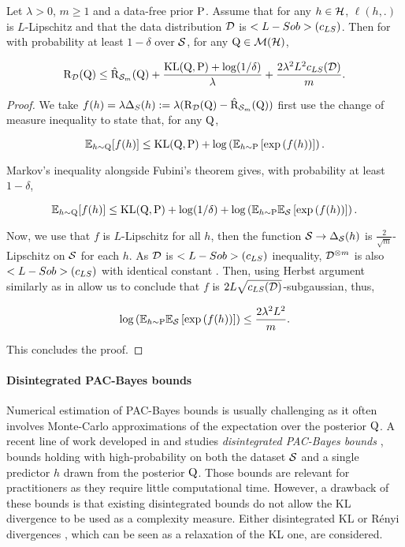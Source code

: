 \begin{noaddcontents}
    \begin{corollary}
      \label{cor: catoni_lpz}
      Let $\lambda >0$, $m\geq 1$ and a data-free prior $\P$. Assume that for any $h\in\Hcal$, $\ell(h,.)$ is $L$-Lipschitz and that the data distribution $\D$ is $\Lsob(c_{LS})$. Then for with probability at least $1-\delta$ over $\S$, for any $\Q\in \Mcal(\Hcal)$,
    
      \[ \Risk_\D(\Q) \leq \hat{\Risk}_{\S_m}(\Q) + \frac{\KL(\Q,\P) + \log(1/\delta)}{\lambda} + \frac{2\lambda^2L^2c_{LS}(\D)}{m}.  \]
    \end{corollary}
     
    \begin{proof}
      We take $f(h)= \lambda \Delta_S(h):= \lambda (\Risk_\D(\Q) - \hat{\Risk}_{\S_m}(\Q))$  first use the change of measure inequality \citep{csizar1975divergence,donsker1976asymp} to state that, for any $\Q$, 
    
      \[ \mathbb{E}_{h\sim\Q}[f(h)] \leq \KL(\Q,\P) + \log \LP\mathbb{E}_{h\sim\P} \LB \exp \LP f(h) \RP \RB \RP. \]
    
      Markov's inequality alongside Fubini's theorem gives, with probability at least $1-\delta$,
    
      \[ \mathbb{E}_{h\sim\Q}[f(h)] \leq \KL(\Q,\P) + \log(1/\delta) + \log \LP\mathbb{E}_{h\sim\P} \mathbb{E}_\S \LB \exp \LP f(h) \RP \RB \RP. \]
    
      Now, we use that $f$ is $L$-Lipschitz for all $h$, then the function $\S \rightarrow \Delta_\S(h)$ is $\frac{2}{\sqrt{m}}$-Lipschitz on $\S$ for each $h$. As $\D$ is $\Lsob(c_{LS})$ inequality, $\D^{\otimes m}$ is also $\Lsob(c_{LS})$ with identical constant \citep[Corollary 3.2.3]{ane2000inegalites}. Then, using Herbst argument similarly as in \citet[Section 2.3]{ledoux2006concentration} allow us to conclude that $f$ is $2L\sqrt{c_{LS}(\D)}$-subgaussian, thus,
    
     \[\log \LP\mathbb{E}_{h\sim\P} \mathbb{E}_\S \LB \exp \LP f(h) \RP \RB \RP \leq \frac{2\lambda^2L^2}{m}.\]
    
     This concludes the proof. 
    \end{proof}
    
    \paragraph{Disintegrated PAC-Bayes bounds} 
    Numerical estimation of PAC-Bayes bounds is usually challenging as it often involves Monte-Carlo approximations of the expectation over the posterior $\Q$.
    A recent line of work developed in  and \citet{rivasplata2020pac,viallard2023general} studies \emph{disintegrated PAC-Bayes bounds} \eg, bounds holding with high-probability on both the dataset $\S$ and a single predictor $h$ drawn from the posterior $\Q$. Those bounds are relevant for practitioners as they require little computational time. However, a drawback of these bounds is that existing disintegrated bounds do not allow the KL divergence to be used as a complexity measure. Either disintegrated KL \citep{rivasplata2020pac} or Rényi divergences \citep{viallard2023general}, which can be seen as a relaxation of the KL one, are considered. 
    

\end{noaddcontents}
